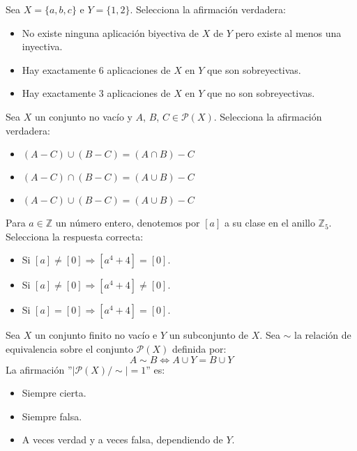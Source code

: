 \documentclass[12pt]{article}
\newcounter{ejercicio}[section] %
\newcounter{ejercicio}
\begin{document}
    \begin{ejercicio}
        Sea $X = \{a, b, c\}$ e $Y = \{1, 2\}$. Selecciona la afirmación verdadera:
        \begin{itemize}
            \item No existe ninguna aplicación biyectiva de $X$ de $Y$ pero existe al menos una inyectiva.
            \item Hay exactamente 6 aplicaciones de $X$ en $Y$ que son sobreyectivas.
            \item Hay exactamente 3 aplicaciones de $X$ en $Y$ que no son sobreyectivas.
        \end{itemize}
    \end{ejercicio}

    \begin{ejercicio}
        Sea $X$ un conjunto no vacío y $A$, $B$, $C \in \mathcal{P}(X)$. Selecciona la afirmación verdadera:
        \begin{itemize}
            \item $(A-C) \cup (B-C) = (A\cap B)-C$
            \item $(A-C) \cap (B-C) = (A\cup B)-C$
            \item $(A-C) \cup (B-C) = (A\cup B)-C$
        \end{itemize}
    \end{ejercicio}

    \begin{ejercicio}
        Para $a \in \mathbb{Z}$ un número entero, denotemos por $[a]$ a su clase en el anillo $\mathbb{Z}_5$. Selecciona la respuesta correcta:
        \begin{itemize}
            \item Si $[a] \neq [0] \Rightarrow [a^4+4] = [0]$.
            \item Si $[a] \neq [0] \Rightarrow [a^4+4] \neq [0]$.
            \item Si $[a] = [0] \Rightarrow [a^4+4] = [0]$.
        \end{itemize}
    \end{ejercicio}

    \begin{ejercicio}
        Sea $X$ un conjunto finito no vacío e $Y$ un subconjunto de $X$. Sea $\sim$ la relación de equivalencia sobre el conjunto $\mathcal{P}(X)$ definida por:
        $$A \sim B \Leftrightarrow A \cup Y = B \cup Y$$
        La afirmación ''$|\mathcal{P}(X)/\sim|=1$'' es:
        \begin{itemize}
            \item Siempre cierta.
            \item Siempre falsa.
            \item A veces verdad y a veces falsa, dependiendo de $Y$.
        \end{itemize}
    \end{ejercicio}
\end{document}
